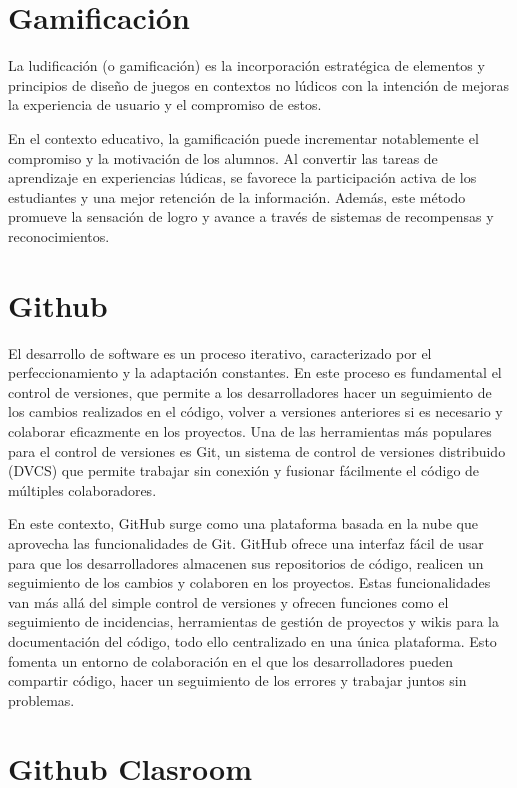 \section{Gamificación}
La ludificación (o gamificación) es la incorporación estratégica de elementos y principios de diseño de juegos en contextos no lúdicos con la intención de mejoras la experiencia de usuario y el compromiso de estos.\cite{10.1145/1979742.1979575}

En el contexto educativo, la gamificación puede incrementar notablemente el compromiso y la motivación de los alumnos. Al convertir las tareas de aprendizaje en experiencias lúdicas, se favorece la participación activa de los estudiantes y una mejor retención de la información. Además, este método promueve la sensación de logro y avance a través de sistemas de recompensas y reconocimientos.\cite{Tu2014}\cite{Barata2013}\cite{Lister2015}

\section{Github}
El desarrollo de software es un proceso iterativo, caracterizado por el perfeccionamiento y la adaptación constantes.  En este proceso es fundamental el control de versiones, que permite a los desarrolladores hacer un seguimiento de los cambios realizados en el código, volver a versiones anteriores si es necesario y colaborar eficazmente en los proyectos.  Una de las herramientas más populares para el control de versiones es Git, un sistema de control de versiones distribuido (DVCS) que permite trabajar sin conexión y fusionar fácilmente el código de múltiples colaboradores.\cite{gitlabWhatVersion}

En este contexto, GitHub surge como una plataforma basada en la nube que aprovecha las funcionalidades de Git.  GitHub ofrece una interfaz fácil de usar para que los desarrolladores almacenen sus repositorios de código, realicen un seguimiento de los cambios y colaboren en los proyectos.  Estas funcionalidades van más allá del simple control de versiones y ofrecen funciones como el seguimiento de incidencias, herramientas de gestión de proyectos y wikis para la documentación del código, todo ello centralizado en una única plataforma.  Esto fomenta un entorno de colaboración en el que los desarrolladores pueden compartir código, hacer un seguimiento de los errores y trabajar juntos sin problemas.\cite{githubAboutGitHub}

\section{Github Clasroom}

